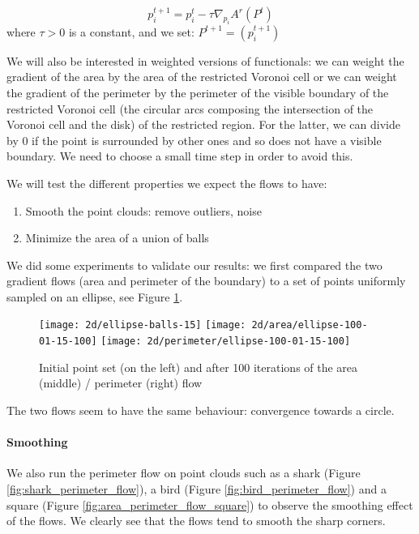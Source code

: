\begin{equation}
    p_i^{t+1} = p_i^t - \tau \nabla_{p_i} A^r(P^t)
\end{equation}
where $ \tau > 0 $ is a constant, and we set: $ P^{t+1} = (p_i^{t+1}) $

We will also be interested in weighted versions of functionals: we can weight
the gradient of the area by the area of the restricted Voronoi cell or we can
weight the gradient of the perimeter by the perimeter of the visible boundary of
the restricted Voronoi cell (the circular arcs composing the intersection of the
Voronoi cell and the disk) of the restricted region. For the latter, we can
divide by $ 0 $ if the point is surrounded by other ones and so does not have a
visible boundary. We need to choose a small time step in order to avoid this.

We will test the different properties we expect the flows to have:
\begin{enumerate}
    \item Smooth the point clouds: remove outliers, noise
    \item Minimize the area of a union of balls
\end{enumerate}

We did some experiments to validate our results: we first compared the two
gradient flows (area and perimeter of the boundary) to a set of points uniformly
sampled on an ellipse, see Figure \ref{fig:ellipse_flows}.

\begin{figure}[h]
    \centering

    \texttt{[image: 2d/ellipse-balls-15]}
    \texttt{[image: 2d/area/ellipse-100-01-15-100]}
    \texttt{[image: 2d/perimeter/ellipse-100-01-15-100]}
    \caption{Initial point set (on the left) and after 100 iterations of the
        area (middle) / perimeter (right) flow}
    \label{fig:ellipse_flows}
\end{figure}

The two flows seem to have the same behaviour: convergence towards a circle.

\paragraph{Smoothing}

We also run the perimeter flow on point clouds such as a shark (Figure
\ref{fig:shark_perimeter_flow}), a bird (Figure \ref{fig:bird_perimeter_flow})
and a square (Figure \ref{fig:area_perimeter_flow_square}) to observe the
smoothing effect of the flows. We clearly see that the flows tend to smooth the sharp corners.

